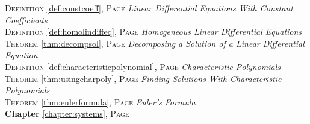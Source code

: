 \begin{multicols}{2}
{\textsc{Definition} \ref{def:constcoeff}, \textsc{Page} \pageref{def:constcoeff} \textit{Linear Differential Equations With Constant Coefficients} \\
\textsc{Definition} \ref{def:homolindiffeq}, \textsc{Page} \pageref{def:homolindiffeq} \textit{Homogeneous Linear Differential Equations} \\
\textsc{Theorem} \ref{thm:decompsol}, \textsc{Page} \pageref{thm:decompsol} \textit{Decomposing a Solution of a Linear Differential Equation} \\
\textsc{Definition} \ref{def:characteristicpolynomial}, \textsc{Page} \pageref{def:characteristicpolynomial} \textit{Characteristic Polynomials} \\
\textsc{Theorem} \ref{thm:usingcharpoly}, \textsc{Page} \pageref{thm:usingcharpoly} \textit{Finding Solutions With Characteristic Polynomials} \\
\textsc{Theorem} \ref{thm:eulerformula}, \textsc{Page} \pageref{thm:eulerformula} \textit{Euler's Formula} \\
\textbf{Chapter} \ref{chapter:systems}, \textsc{Page} \pageref{chapter:systems} \\

      }
\end{multicols}

